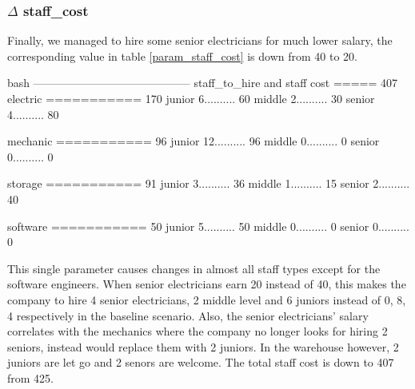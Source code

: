     \subsubsection{$\Delta$ staff\_cost}
    Finally, we managed to hire some senior electricians for much lower salary, the corresponding 
    value in table \ref{param_staff_cost} is down from 40 to 20.
    \bigskip
    \newline
        \vspace{2pt}
        \begin{boxminted}{bash}
            ------------------------------------------
            staff_to_hire and staff cost ===== 407
            electric   =========== 170
            junior     6.......... 60
            middle     2.......... 30
            senior     4.......... 80
            
            mechanic   =========== 96
            junior     12.......... 96
            middle     0.......... 0
            senior     0.......... 0
            
            storage   =========== 91
            junior     3.......... 36
            middle     1.......... 15
            senior     2.......... 40
            
            software   =========== 50
            junior     5.......... 50
            middle     0.......... 0
            senior     0.......... 0                      
        \end{boxminted}
    \newline
    This single parameter causes changes in almost all staff types except for the software engineers.
    When senior electricians earn 20 instead of 40, this makes the company to hire 4 senior 
    electricians, 2 middle level and 6 juniors instead of 0, 8, 4 respectively in the baseline
    scenario. Also, the senior electricians' salary correlates with the mechanics where the company
    no longer looks for hiring 2 seniors, instead would replace them with 2 juniors. In the warehouse
    however, 2 juniors are let go and 2 senors are welcome. The total staff cost is down to 407 from
    425.